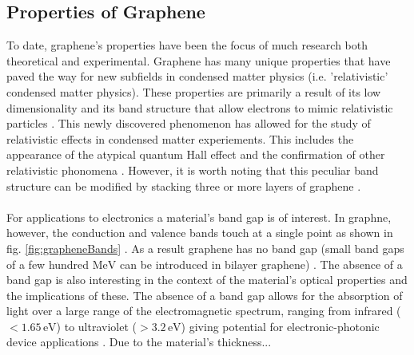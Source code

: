 \documentclass[%
 reprint,
 amsmath,amssymb,
 aps,
pra,
floatfix,
]{revtex4-1}
\begin{document}
\subsection{\label{subsec:properties_graphene} Properties of Graphene}
To date, graphene's properties have been the focus of much research both theoretical and experimental. Graphene has many unique properties that have paved the way for new subfields in condensed matter physics (i.e. 'relativistic' condensed matter physics). These properties are primarily a result of its low dimensionality and its band structure that allow electrons to mimic relativistic particles \cite{Giem2007}. This newly discovered phenomenon has allowed for the study of relativistic effects in condensed matter experiements. This includes the appearance of the atypical quantum Hall effect and the confirmation of other relativistic phonomena \cite{Geim2005_quantum, Zhang2011, Williams2007}. However, it is worth noting that this peculiar band structure can be modified by stacking three or more layers of graphene \cite{nanoscaleReview2011}. 
\\ \\
For applications to electronics a material's band gap is of interest. In graphne, however, the conduction and valence bands touch at a single point as shown in fig. \ref{fig:grapheneBands} \cite{Wallace1947, nanoscaleReview2011}. As a result graphene has no band gap (small band gaps of a few hundred $\textrm{MeV}$ can be introduced in bilayer graphene) \cite{grapheneLike2Dreview2013}. The absence of a band gap is also interesting in the context of the material's optical properties and the implications of these. The absence of a band gap allows for the absorption of light over a large range of the electromagnetic spectrum, ranging from infrared ($< 1.65 \mathrm{\,eV}$) to ultraviolet ($> 3.2 \mathrm{\,eV}$) giving potential for electronic-photonic device applications \cite{Wang2008, Geim2011, Xia2009}. Due to the material's thickness...
\end{document}
